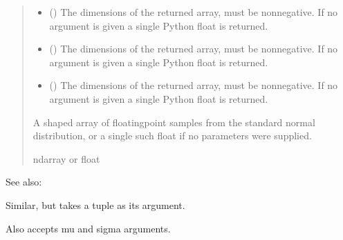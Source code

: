 \documentclass[letterpaper,10pt,english]{sphinxmanual}
\begin{document}
\begin{fulllineitems}
\begin{quote}
\begin{description}
\begin{itemize}
\item {} 
\sphinxAtStartPar
{} (\sphinxstyleliteralemphasis{\sphinxupquote{, }}) \textendash{} The dimensions of the returned array, must be non\sphinxhyphen{}negative.
If no argument is given a single Python float is returned.

\item {} 
\sphinxAtStartPar
{} (\sphinxstyleliteralemphasis{\sphinxupquote{, }}) \textendash{} The dimensions of the returned array, must be non\sphinxhyphen{}negative.
If no argument is given a single Python float is returned.

\item {} 
\sphinxAtStartPar
{} (\sphinxstyleliteralemphasis{\sphinxupquote{, }}) \textendash{} The dimensions of the returned array, must be non\sphinxhyphen{}negative.
If no argument is given a single Python float is returned.

\end{itemize}

\sphinxAtStartPar
{} \textendash{} A \sphinxhyphen{}shaped array of floating\sphinxhyphen{}point samples from
the standard normal distribution, or a single such float if
no parameters were supplied.

\sphinxAtStartPar
ndarray or float

\end{description}\end{quote}


\begin{sphinxseealso}{See also:}
\begin{description}
\sphinxAtStartPar
Similar, but takes a tuple as its argument.

\sphinxAtStartPar
Also accepts mu and sigma arguments.


\end{description}
\end{sphinxseealso}
\end{fulllineitems}
\end{document}
